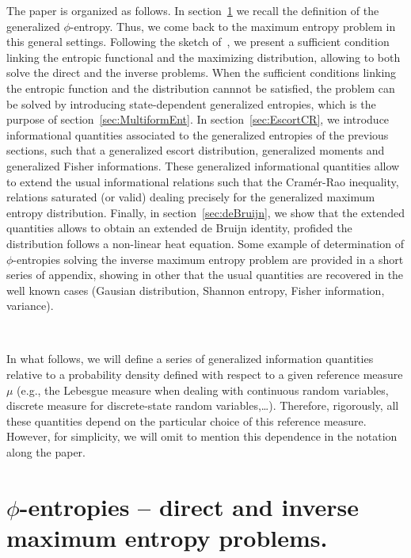 \documentclass[entropy,article,submit,moreauthors,pdftex]{Definitions/mdpi}
\begin{document}
The paper is organized as  follows. In section~\ref{sec:MaxPhiEnt} we recall the
definition of the generalized $\phi$-entropy.  Thus, we come back to the maximum
entropy   problem   in   this    general   settings.    Following   the   sketch
of~\cite{KesKap89},  we  present a  sufficient  condition  linking the  entropic
functional and  the maximizing distribution,  allowing to both solve  the direct
and the inverse  problems.  When the sufficient conditions  linking the entropic
function and the distribution cannnot be satisfied, the problem can be solved by
introducing  state-dependent  generalized entropies,  which  is  the purpose  of
section~\ref{sec:MultiformEnt}.   In  section~\ref{sec:EscortCR},  we  introduce
informational quantities associated to the generalized entropies of the previous
sections, such that  a generalized escort distribution,  generalized moments and
generalized  Fisher informations.   These  generalized informational  quantities
allow to  extend the  usual informational relations  such that  the Cram\'er-Rao
inequality, relations saturated (or valid) dealing precisely for the generalized
maximum entropy  distribution.  Finally, in section~\ref{sec:deBruijn},  we show
that the  extended quantities allows to  obtain an extended de  Bruijn identity,
profided the distribution  follows a non-linear heat equation.   Some example of
determination of  $\phi$-entropies solving  the inverse maximum  entropy problem
are provided  in a  short series of  appendix, showing in  other that  the usual
quantities are recovered in the  well known cases (Gausian distribution, Shannon
entropy, Fisher information, variance).

\

In what follows,  we will define a series of  generalized information quantities
relative to  a probability  density defined  with respect  to a  given reference
measure $\mu$  (e.g., the Lebesgue  measure when dealing with  continuous random
variables,  discrete   measure  for  discrete-state   random  variables,\ldots).
Therefore, rigorously, all  these quantities depend on the  particular choice of
this reference  measure. However, for simplicity,  we will omit to  mention this
dependence in the notation along the paper.




\section{$\phi$-entropies -- direct and inverse maximum entropy problems.}
\label{sec:MaxPhiEnt}
\end{document}
